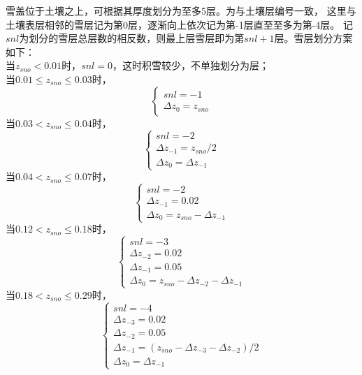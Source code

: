 雪盖位于土壤之上，可根据其厚度划分为至多5层。为与土壤层编号一致，
这里与土壤表层相邻的雪层记为第0层，逐渐向上依次记为第-1层直至至多为第-4层。
记$snl$为划分的雪层总层数的相反数，则最上层雪层即为第$snl+1$层。雪层划分方案如下：\\
当$z_{sno}<0.01$时，$snl=0$，这时积雪较少，不单独划分为层；\\
当$0.01\le z_{sno}\le0.03$时，\\
\begin{equation}
\left\{\begin{array}{c}s n l=-1 \\ \Delta z_{0}=z_{sno}\end{array}\right.
\end{equation}
当$0.03<z_{sno}\le0.04$时，
\begin{equation}
\left\{\begin{array}{c}s n l=-2 \\ \Delta z_{-1}=z_{sno} / 2 \\ \Delta z_{0}=\Delta z_{-1}\end{array}\right.
\end{equation}
当$0.04<z_{sno}\le0.07$时，
\begin{equation}
\left\{\begin{array}{c}s n l=-2 \\ \Delta z_{-1}=0.02 \\ \Delta z_{0}=z_{sno}-\Delta z_{-1}\end{array}\right.
\end{equation}
当$0.12<z_{sno}\le0.18$时，
\begin{equation}
\left\{\begin{array}{c}s n l=-3 \\ \Delta z_{-2}=0.02 \\ \Delta z_{-1}=0.05 \\ \Delta z_{0}=z_{sno}-\Delta z_{-2}-\Delta z_{-1}\end{array}\right.
\end{equation}
当$0.18<z_{sno}\le0.29$时，
\begin{equation}
\left\{\begin{array}{c}s n l=-4 \\ \Delta z_{-3}=0.02 \\ \Delta z_{-2}=0.05 \\ \Delta z_{-1}=\left(z_{sno}-\Delta z_{-3}-\Delta z_{-2}\right) / 2 \\ \Delta z_{0}=\Delta z_{-1}\end{array}\right.
\end{equation}
